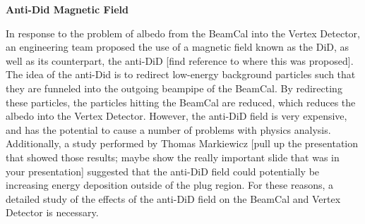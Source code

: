 \documentclass{article}
\begin{document}
        \begin{center}
            \bf{Anti-Did Magnetic Field}
        \end{center}

        In response to the problem of albedo from the BeamCal into the Vertex Detector, an engineering team proposed the use of a magnetic field known as the DiD, as well as its counterpart, the anti-DiD [find reference to where this was proposed]. The idea of the anti-Did is to redirect low-energy background particles such that they are funneled into the outgoing beampipe of the BeamCal. By redirecting these particles, the particles hitting the BeamCal are reduced, which reduces the albedo into the Vertex Detector. However, the anti-DiD field is very expensive, and has the potential to cause a number of problems with physics analysis. Additionally, a study performed by Thomas Markiewicz [pull up the presentation that showed those results; maybe show the really important slide that was in your presentation] suggested that the anti-DiD field could potentially be increasing energy deposition outside of the plug region. For these reasons, a detailed study of the effects of the anti-DiD field on the BeamCal and Vertex Detector is necessary.
\end{document}
